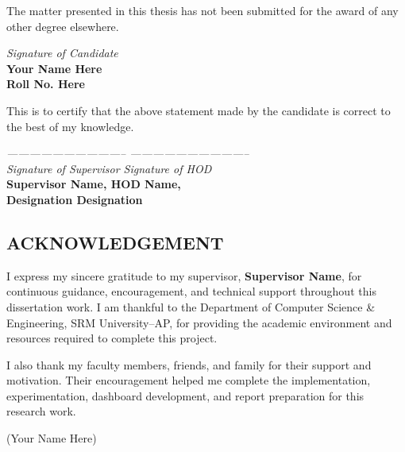 \documentclass[12pt,a4paper]{report}
\begin{document}
\vspace{30pt}
\par
The matter presented in this thesis has not been submitted for the award of any other degree elsewhere.
\begin{flushright}
	\textit{Signature of Candidate\\}
	\textbf{Your Name Here\\Roll No. Here\\}
\end{flushright}
\vspace{30pt}

\par
This is to certify that the above statement made by the candidate is correct to the best of my knowledge.
\vspace{20pt}

\begin{flushleft}
\textit{-------------------------------- \hfill --------------------------------\\}
	\textit{Signature of Supervisor \hfill Signature of HOD\\}
	\textbf{Supervisor Name, \hfill HOD Name,\\ Designation \hfill Designation}
\end{flushleft}

\clearpage

\begin{center}
	\section*{ACKNOWLEDGEMENT}
	\noindent{\rule{\textwidth}{1.5pt}}
\end{center}
I express my sincere gratitude to my supervisor, \textbf{Supervisor Name}, for continuous guidance, encouragement, and technical support throughout this dissertation work. I am thankful to the Department of Computer Science \& Engineering, SRM University--AP, for providing the academic environment and resources required to complete this project.

I also thank my faculty members, friends, and family for their support and motivation. Their encouragement helped me complete the implementation, experimentation, dashboard development, and report preparation for this research work.

\begin{flushright}
	(Your Name Here)
\end{flushright}
\end{document}
